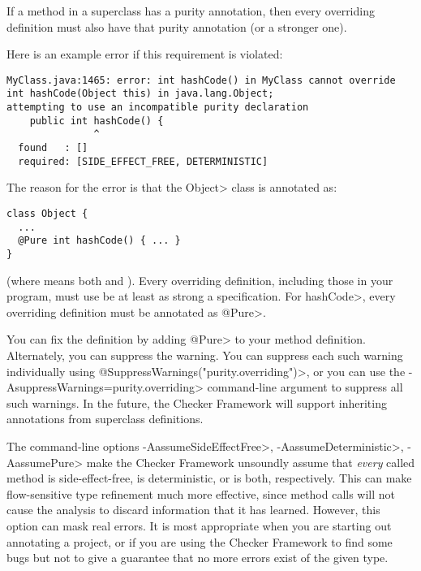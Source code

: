 
If a method in a superclass has a purity annotation, then every overriding
definition must also have that purity annotation (or a stronger one).

Here is an example error if this requirement is violated:

\begin{mysmall}
\begin{Verbatim}
MyClass.java:1465: error: int hashCode() in MyClass cannot override int hashCode(Object this) in java.lang.Object;
attempting to use an incompatible purity declaration
    public int hashCode() {
               ^
  found   : []
  required: [SIDE_EFFECT_FREE, DETERMINISTIC]
\end{Verbatim}
\end{mysmall}

\noindent
The reason for the error is that the \<Object> class is annotated as:

\begin{Verbatim}
class Object {
  ...
  @Pure int hashCode() { ... }
}
\end{Verbatim}

\noindent
(where  means both
 and
).  Every overriding
definition, including those in your program, must use be at least as strong
a specification.  For \<hashCode>, every overriding definition must be
annotated as \<@Pure>.

You can fix the definition by adding \<@Pure> to your method definition.
Alternately, you can suppress the warning.
You can suppress each such warning individually using
\<@SuppressWarnings("purity.overriding")>,
or you can use the \<-AsuppressWarnings=purity.overriding>
command-line argument to suppress all such warnings.
In the future, the Checker Framework will support inheriting annotations
from superclass definitions.



The command-line options \<-AassumeSideEffectFree>,
\<-AassumeDeterministic>, \<-AassumePure> make the Checker Framework unsoundly
assume that \emph{every} called method is side-effect-free, is
deterministic, or is both, respectively.  This can make
flow-sensitive type refinement much more effective, since method calls will
not cause the analysis to discard information that it has learned.
However, this option can mask real errors.  It is most appropriate when you
are starting out annotating a project, or if you are using the Checker
Framework to find some bugs but not to give a guarantee that no more errors
exist of the given type.

